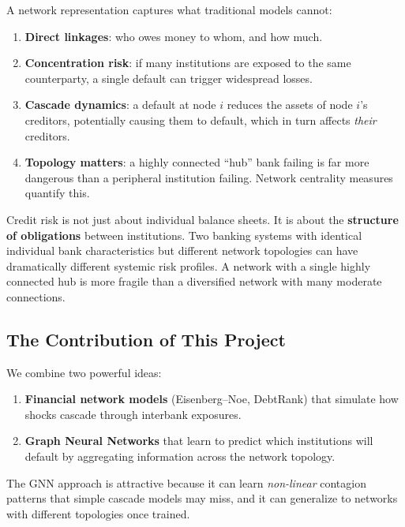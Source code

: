 \documentclass[11pt, a4paper]{article}
\theoremstyle{definition}
\theoremstyle{plain}
\theoremstyle{remark}
\begin{document}
A network representation captures what traditional models cannot:
\begin{enumerate}
    \item \textbf{Direct linkages}: who owes money to whom, and how much.
    \item \textbf{Concentration risk}: if many institutions are exposed to the
          same counterparty, a single default can trigger widespread losses.
    \item \textbf{Cascade dynamics}: a default at node $i$ reduces the assets of
          node $i$'s creditors, potentially causing them to default, which in turn
          affects \emph{their} creditors.
    \item \textbf{Topology matters}: a highly connected ``hub'' bank failing is
          far more dangerous than a peripheral institution failing.
          Network centrality measures quantify this.
\end{enumerate}

\begin{keyidea}
Credit risk is not just about individual balance sheets.
It is about the \textbf{structure of obligations} between institutions.
Two banking systems with identical individual bank characteristics but different
network topologies can have dramatically different systemic risk profiles.
A network with a single highly connected hub is more fragile than a diversified
network with many moderate connections.
\end{keyidea}

\subsection{The Contribution of This Project}

We combine two powerful ideas:
\begin{enumerate}
    \item \textbf{Financial network models} (Eisenberg--Noe, DebtRank) that simulate
          how shocks cascade through interbank exposures.
    \item \textbf{Graph Neural Networks} that learn to predict which institutions
          will default by aggregating information across the network topology.
\end{enumerate}

The GNN approach is attractive because it can learn \emph{non-linear} contagion
patterns that simple cascade models may miss, and it can generalize to networks
with different topologies once trained.
\end{document}
